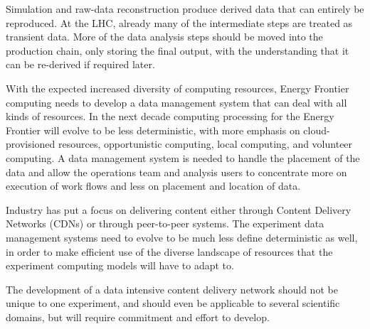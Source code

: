 Simulation and raw-data reconstruction produce derived data that can
entirely be reproduced. At the LHC, already many of the intermediate steps are
treated as transient data.   More of the data analysis steps should be moved
into the production chain, only storing the final output, with the
understanding that it can be re-derived if required later.

With the expected increased diversity of computing resources, Energy Frontier computing
needs to develop a data management system that can deal with all kinds of
resources.   In the next decade computing processing for the Energy Frontier will evolve to
be less deterministic, with more emphasis on cloud-provisioned resources,
opportunistic computing, local computing, and volunteer computing.   A data
management system is needed to handle the placement of the data and allow the
operations team and analysis users to concentrate more on execution of work
flows and less on placement and location of data.

Industry has put a focus on delivering content either through Content
Delivery Networks (CDNs) or through peer-to-peer systems.  The experiment data
management systems need to evolve to be much less {\color{red} define} deterministic as well, in
order to make efficient use of the diverse landscape of resources that the
experiment computing models will have to adapt to.

The development of a data intensive content delivery network should not be
unique to one experiment, and should even be applicable to several scientific
domains, but will require commitment and effort to develop.


